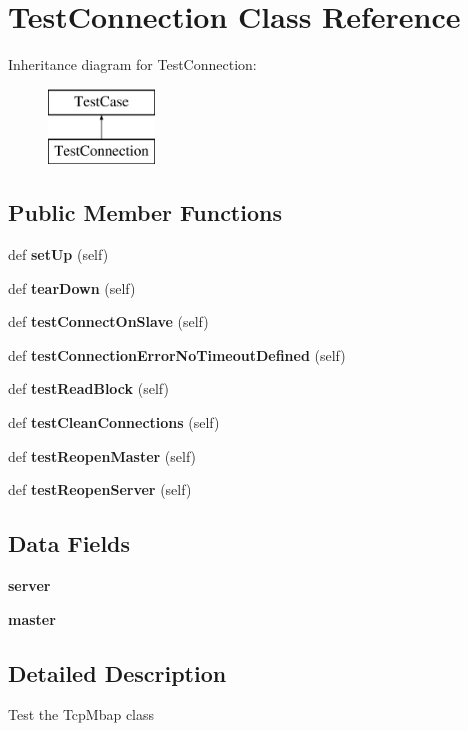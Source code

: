 \section{Test\+Connection Class Reference}
\label{classtests_1_1functest__modbus__tcp_1_1_test_connection}
Inheritance diagram for Test\+Connection\+:\begin{figure}[H]
\begin{center}
\leavevmode
\includegraphics[height=2.000000cm]{classtests_1_1functest__modbus__tcp_1_1_test_connection}
\end{center}
\end{figure}
\subsection*{Public Member Functions}
\begin{DoxyCompactItemize}
\item 
def {\bf set\+Up} (self)
\item 
def {\bf tear\+Down} (self)
\item 
def {\bf test\+Connect\+On\+Slave} (self)
\item 
def {\bf test\+Connection\+Error\+No\+Timeout\+Defined} (self)
\item 
def {\bf test\+Read\+Block} (self)
\item 
def {\bf test\+Clean\+Connections} (self)
\item 
def {\bf test\+Reopen\+Master} (self)
\item 
def {\bf test\+Reopen\+Server} (self)
\end{DoxyCompactItemize}
\subsection*{Data Fields}
\begin{DoxyCompactItemize}
\item 
{\bf server}
\item 
{\bf master}
\end{DoxyCompactItemize}


\subsection{Detailed Description}
\begin{DoxyVerb}Test the TcpMbap class\end{DoxyVerb}
 

